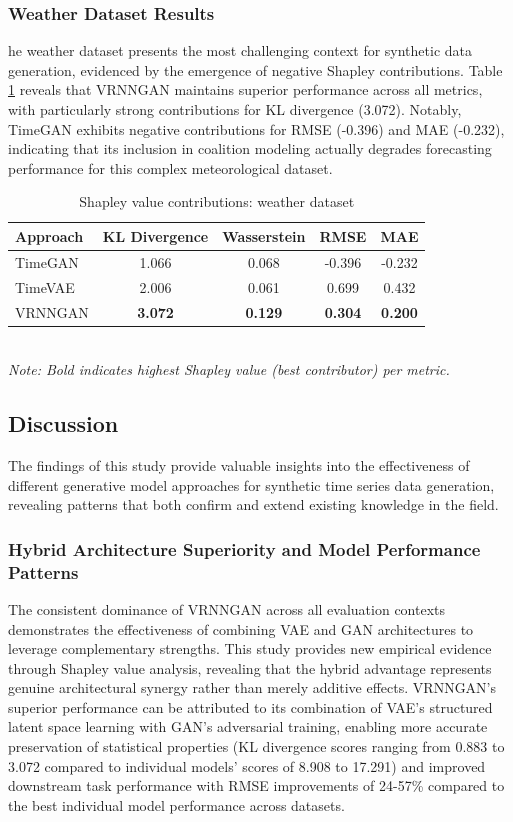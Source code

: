 \documentclass{article}
\begin{document}
\subsubsection{Weather Dataset Results}
he weather dataset presents the most challenging context for synthetic data generation, evidenced by the emergence of negative Shapley contributions. Table \ref{tab:shapley_weather} reveals that VRNNGAN maintains superior performance across all metrics, with particularly strong contributions for KL divergence (3.072). Notably, TimeGAN exhibits negative contributions for RMSE (-0.396) and MAE (-0.232), indicating that its inclusion in coalition modeling actually degrades forecasting performance for this complex meteorological dataset.

\begin{table}[H]
\centering
\caption{Shapley value contributions: weather dataset}
\label{tab:shapley_weather}
\begin{tabular}{lcccc}
\toprule
\textbf{Approach} & \textbf{KL Divergence} & \textbf{Wasserstein} & \textbf{RMSE} & \textbf{MAE} \\
\midrule
TimeGAN & 1.066 & 0.068 & -0.396 & -0.232 \\
TimeVAE & 2.006 & 0.061 & 0.699 & 0.432 \\
VRNNGAN & \textbf{3.072} & \textbf{0.129} & \textbf{0.304} & \textbf{0.200} \\
\bottomrule
\end{tabular}
\\[0.5em]
\footnotesize
\textit{Note: Bold indicates highest Shapley value (best contributor) per metric.}
\end{table}

\subsection{Discussion}

The findings of this study provide valuable insights into the effectiveness of different generative model approaches for synthetic time series data generation, revealing patterns that both confirm and extend existing knowledge in the field.

\subsubsection{Hybrid Architecture Superiority and Model Performance Patterns}

The consistent dominance of VRNNGAN across all evaluation contexts demonstrates the effectiveness of combining VAE and GAN architectures to leverage complementary strengths. This study provides new empirical evidence through Shapley value analysis, revealing that the hybrid advantage represents genuine architectural synergy rather than merely additive effects. VRNNGAN's superior performance can be attributed to its combination of VAE's structured latent space learning with GAN's adversarial training, enabling more accurate preservation of statistical properties (KL divergence scores ranging from 0.883 to 3.072 compared to individual models' scores of 8.908 to 17.291) and improved downstream task performance with RMSE improvements of 24-57\% compared to the best individual model performance across datasets.
\end{document}
